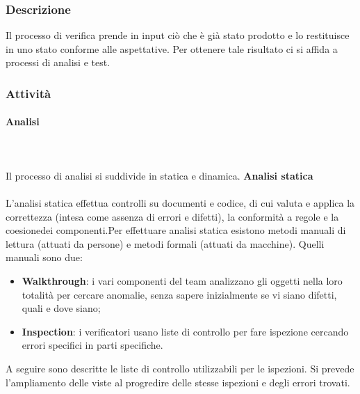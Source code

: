 	\subsubsection{Descrizione}
	Il processo di verifica prende in input ciò che è già stato prodotto e lo restituisce in uno stato conforme alle aspettative. Per ottenere tale risultato ci si affida a processi di analisi e test.
	\subsubsection{Attività}
		\paragraph{Analisi} \mbox{}\\ \mbox{}\\
		Il processo di analisi si suddivide in statica e dinamica. \newline \newline
			\textbf{Analisi statica} \mbox{}\\ \mbox{}\\
			L'analisi statica effettua controlli su documenti e codice, di cui valuta e applica la correttezza (intesa come assenza di errori e difetti), la conformità a regole e la coesione\glosp dei componenti.\newline Per effettuare analisi statica esistono metodi manuali di lettura (attuati da persone) e metodi formali (attuati da macchine). Quelli manuali sono due:
			\begin{itemize}
				\item \textbf{Walkthrough}: i vari componenti del team analizzano gli oggetti nella loro totalità per cercare anomalie, senza sapere inizialmente se vi siano difetti, quali e dove siano;
				\item \textbf{Inspection}: i verificatori usano liste di controllo per fare ispezione cercando errori specifici in parti specifiche.
			\end{itemize}
			A seguire sono descritte le liste di controllo utilizzabili per le ispezioni. Si prevede l'ampliamento delle viste al progredire delle stesse ispezioni e degli errori trovati.
